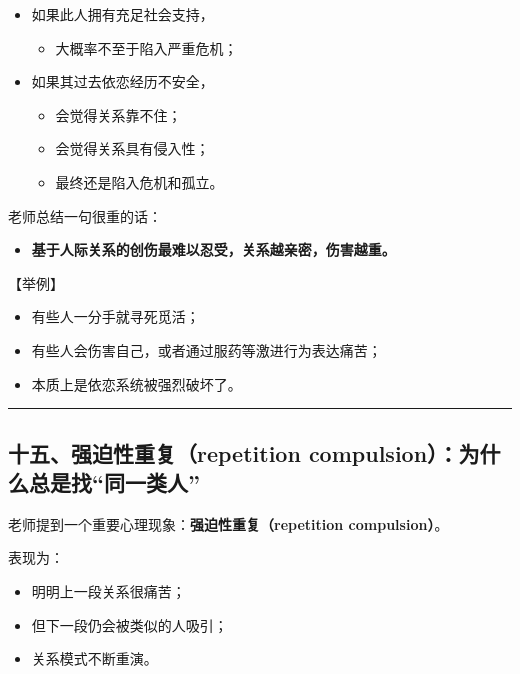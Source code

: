 \documentclass[
  chinese,
  9pt,
  a4paper,
]{ctexart}
\providecommand{\tightlist}{%
  \setlength{\itemsep}{0pt}\setlength{\parskip}{0pt}}
\begin{document}
\begin{itemize}
\item
  如果此人拥有充足社会支持，

  \begin{itemize}
  \tightlist
  \item
    大概率不至于陷入严重危机；
  \end{itemize}
\item
  如果其过去依恋经历不安全，

  \begin{itemize}
  \tightlist
  \item
    会觉得关系靠不住；
  \item
    会觉得关系具有侵入性；
  \item
    最终还是陷入危机和孤立。
  \end{itemize}
\end{itemize}

老师总结一句很重的话：

\begin{itemize}
\tightlist
\item
  \textbf{基于人际关系的创伤最难以忍受，关系越亲密，伤害越重。}
\end{itemize}

【举例】

\begin{itemize}
\tightlist
\item
  有些人一分手就寻死觅活；
\item
  有些人会伤害自己，或者通过服药等激进行为表达痛苦；
\item
  本质上是依恋系统被强烈破坏了。
\end{itemize}

\begin{center}\rule{0.5\linewidth}{0.5pt}\end{center}

\subsection{十五、强迫性重复（repetition
compulsion）：为什么总是找``同一类人''}\label{ux5341ux4e94ux5f3aux8febux6027ux91cdux590drepetition-compulsionux4e3aux4ec0ux4e48ux603bux662fux627eux540cux4e00ux7c7bux4eba}

老师提到一个重要心理现象：\textbf{强迫性重复（repetition compulsion）}。

表现为：

\begin{itemize}
\tightlist
\item
  明明上一段关系很痛苦；
\item
  但下一段仍会被类似的人吸引；
\item
  关系模式不断重演。
\end{itemize}
\end{document}
